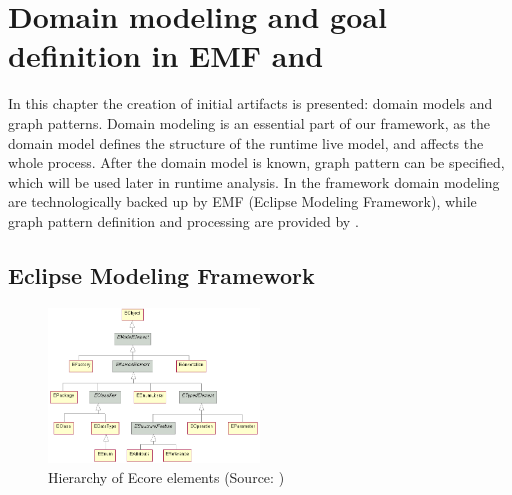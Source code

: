 \chapter{Domain modeling and goal definition in EMF and \viatra{}}

In this chapter the creation of initial artifacts is presented: domain models and graph patterns.
Domain modeling is an essential part of our framework, as the domain model defines the structure of the runtime live model, and affects the whole process. 
After the domain model is known, graph pattern can be specified, which will be used later in runtime analysis.
In the framework domain modeling are technologically backed up by EMF (Eclipse Modeling Framework), 
while graph pattern definition and processing are provided by \viatra{}.

\section{Eclipse Modeling Framework}


\begin{figure}
	\begin{center}
		\includegraphics[width=0.5\textwidth]{figures/EcoreHierarchy.png}
		\caption{Hierarchy of Ecore elements (Source: \cite{ecore-package}) }
		\label{fig:ecore-hierarchy}
	\end{center}
\end{figure}

